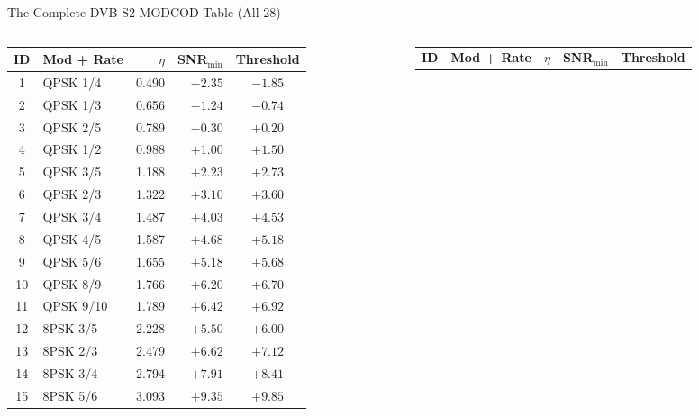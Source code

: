 \documentclass[aspectratio=169,10pt]{beamer}
\begin{document}
\begin{frame}{The Complete DVB-S2 MODCOD Table (All 28)}
  \begin{columns}[T]
    \begin{column}{0.5\textwidth}
      {\scriptsize
      \begin{tabular}{clrrc}
        \toprule
        \textbf{ID} & \textbf{Mod + Rate} & \textbf{$\eta$} & \textbf{SNR$_{\min}$} & \textbf{Threshold}\\
        \midrule
        \rowcolor{NUSblue!8}
        1  & QPSK 1/4  & 0.490 & $-2.35$ & $-1.85$ \\
        2  & QPSK 1/3  & 0.656 & $-1.24$ & $-0.74$ \\
        \rowcolor{NUSblue!8}
        3  & QPSK 2/5  & 0.789 & $-0.30$ & $+0.20$ \\
        4  & QPSK 1/2  & 0.988 & $+1.00$ & $+1.50$ \\
        \rowcolor{NUSblue!8}
        5  & QPSK 3/5  & 1.188 & $+2.23$ & $+2.73$ \\
        6  & QPSK 2/3  & 1.322 & $+3.10$ & $+3.60$ \\
        \rowcolor{NUSblue!8}
        7  & QPSK 3/4  & 1.487 & $+4.03$ & $+4.53$ \\
        8  & QPSK 4/5  & 1.587 & $+4.68$ & $+5.18$ \\
        \rowcolor{NUSblue!8}
        9  & QPSK 5/6  & 1.655 & $+5.18$ & $+5.68$ \\
        10 & QPSK 8/9  & 1.766 & $+6.20$ & $+6.70$ \\
        \rowcolor{NUSblue!8}
        11 & QPSK 9/10 & 1.789 & $+6.42$ & $+6.92$ \\
        \midrule
        \rowcolor{NUSorange!10}
        12 & 8PSK 3/5  & 2.228 & $+5.50$ & $+6.00$ \\
        \rowcolor{NUSorange!10}
        13 & 8PSK 2/3  & 2.479 & $+6.62$ & $+7.12$ \\
        \rowcolor{NUSorange!10}
        14 & 8PSK 3/4  & 2.794 & $+7.91$ & $+8.41$ \\
        \rowcolor{NUSorange!10}
        15 & 8PSK 5/6  & 3.093 & $+9.35$ & $+9.85$ \\
        \bottomrule
      \end{tabular}}
    \end{column}
    \begin{column}{0.47\textwidth}
      {\scriptsize
      \begin{tabular}{clrrc}
        \toprule
        \textbf{ID} & \textbf{Mod + Rate} & \textbf{$\eta$} & \textbf{SNR$_{\min}$} & \textbf{Threshold}\\

\end{tabular}}
\end{column}
\end{columns}
\end{frame}
\end{document}
